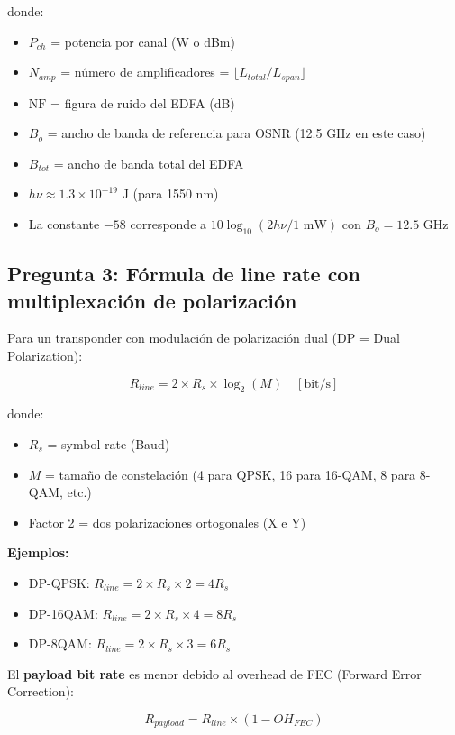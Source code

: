 \documentclass[12pt,a4paper]{extarticle}
\begin{document}
donde:
\begin{itemize}
    \item $P_{ch}$ = potencia por canal (W o dBm)
    \item $N_{amp}$ = número de amplificadores = $\lfloor L_{total} / L_{span} \rfloor$
    \item $\text{NF}$ = figura de ruido del EDFA (dB)
    \item $B_o$ = ancho de banda de referencia para OSNR (12.5 GHz en este caso)
    \item $B_{tot}$ = ancho de banda total del EDFA
    \item $h\nu \approx 1.3 \times 10^{-19}$ J (para 1550 nm)
    \item La constante $-58$ corresponde a $10\log_{10}(2 h \nu / 1 \text{ mW})$ con $B_o = 12.5$ GHz
\end{itemize}

\subsection*{Pregunta 3: Fórmula de line rate con multiplexación de polarización}

Para un transponder con modulación de polarización dual (DP = Dual Polarization):

$$\boxed{R_{line} = 2 \times R_s \times \log_2(M) \quad [\text{bit/s}]}$$

donde:
\begin{itemize}
    \item $R_s$ = symbol rate (Baud)
    \item $M$ = tamaño de constelación (4 para QPSK, 16 para 16-QAM, 8 para 8-QAM, etc.)
    \item Factor 2 = dos polarizaciones ortogonales (X e Y)
\end{itemize}

\textbf{Ejemplos:}
\begin{itemize}
    \item DP-QPSK: $R_{line} = 2 \times R_s \times 2 = 4 R_s$
    \item DP-16QAM: $R_{line} = 2 \times R_s \times 4 = 8 R_s$
    \item DP-8QAM: $R_{line} = 2 \times R_s \times 3 = 6 R_s$
\end{itemize}

El \textbf{payload bit rate} es menor debido al overhead de FEC (Forward Error Correction):

$$R_{payload} = R_{line} \times (1 - OH_{FEC})$$
\end{document}
